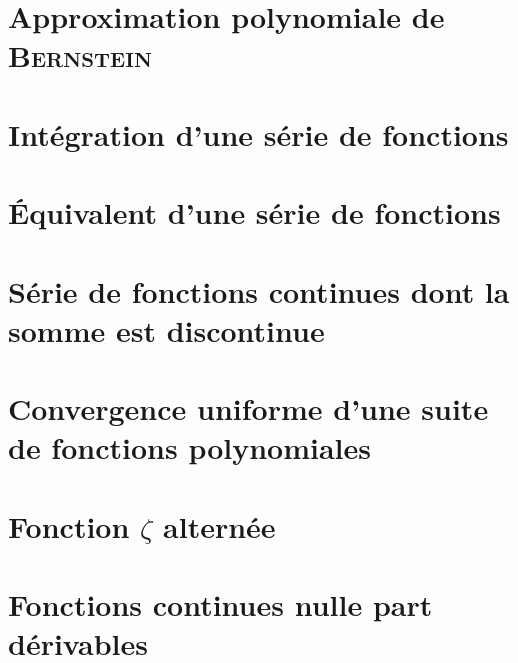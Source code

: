 \section{Approximation polynomiale de \textsc{Bernstein}}


\section{Intégration d'une série de fonctions}


\section{Équivalent d'une série de fonctions}


\section{Série de fonctions continues dont la somme est discontinue}


\section{Convergence uniforme d'une suite de fonctions polynomiales}


\section{Fonction \texorpdfstring{$\zeta$}{zêta} alternée}


\section{Fonctions continues nulle part dérivables}

